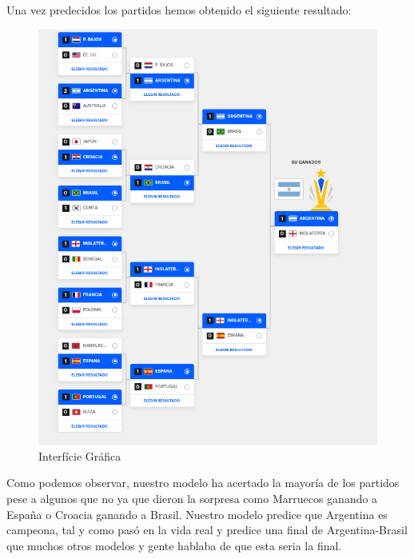 Una vez predecidos los partidos hemos obtenido el siguiente resultado:

\begin{figure}[H]
    \centering
    \includegraphics[width=15cm]{images/prediction.png}
    \caption{Interfície Gráfica}
    \label{Interificie-grafica}
\end{figure}

Como podemos observar, nuestro modelo ha acertado la mayoría de los partidos pese a algunos que no ya que dieron la sorpresa como Marruecos ganando a España o Croacia ganando a Brasil. Nuestro modelo predice que Argentina es campeona, tal y como pasó en la vida real y predice una final de Argentina-Brasil que muchos otros modelos y gente hablaba de que esta seria la final.

\newpage